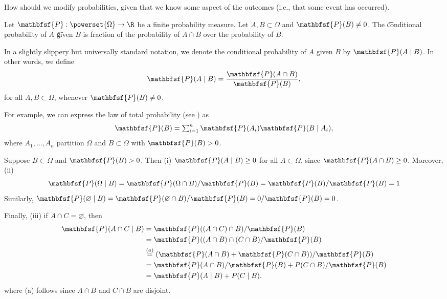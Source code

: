 

How should we modify probabilities, given that we know some aspect of the outcomes (i.e., that some event has occurred).

Let $\mathbfsf{P} : \powerset{\Omega } \to \R $ be a finite probability measure.
Let $A, B \subset \Omega $ and $\mathbfsf{P} (B) \neq 0$.
The \t{conditional probability} of $A$ \t{given} $B$ is fraction of the probability of $A \cap B$ over the probability of $B$.

In a slightly slippery but universally standard notation, we denote the conditional probability of $A$ given $B$ by $\mathbfsf{P} (A \mid  B)$.
In other words, we define
  \[
\mathbfsf{P} (A \mid  B) = \frac{\mathbfsf{P} (A \cap B)}{\mathbfsf{P} (B)},
  \]
for all $A, B \subset \Omega $, whenever $\mathbfsf{P} (B) \neq 0$.

For example, we can express the law of total probability (see ) as
  \[
\textstyle
\mathbfsf{P} (B) = \sum_{i = 1}^{n} \mathbfsf{P} (A_i)\mathbfsf{P} (B \mid  A_i),
  \]
where $A_1, \dots , A_n$ partition $\Omega $ and $B \subset \Omega $ with $\mathbfsf{P} (B) > 0$.

Suppose $B \subset \Omega $ and $\mathbfsf{P} (B) > 0$.
Then (i) $\mathbfsf{P} (A \mid  B) \geq 0$ for all $A \subset \Omega $, since $\mathbfsf{P} (A \cap B) \geq 0$.
Moreover, (ii)
  \[
\mathbfsf{P} (\Omega  \mid  B) = \mathbfsf{P} (\Omega  \cap B)/\mathbfsf{P} (B) = \mathbfsf{P} (B)/\mathbfsf{P} (B) = 1
  \]
Similarly, $\mathbfsf{P} (\varnothing \mid  B) = \mathbfsf{P} (\varnothing \cap B)/\mathbfsf{P} (B) = 0/\mathbfsf{P} (B) = 0$.

Finally, (iii) if $A \cap C = \varnothing$, then
  \[
\begin{aligned}
\mathbfsf{P} (A \cap C \mid  B)
&=
\mathbfsf{P} ((A \cap C) \cap B)/\mathbfsf{P} (B) \\
&=
\mathbfsf{P} ((A \cap B) \cap (C \cap B)/\mathbfsf{P} (B) \\
&\overset{(a)}{=}
(\mathbfsf{P} (A \cap B) + \mathbfsf{P} (C \cap B))/\mathbfsf{P} (B) \\
&=
\mathbfsf{P} (A \cap B)/\mathbfsf{P} (B) + P(C \cap B)/\mathbfsf{P} (B) \\
&=
\mathbfsf{P} (A \mid  B) + P(C \mid  B).
\end{aligned}
  \]
where (a) follows since $A \cap B$ and $C \cap B$ are disjoint.

